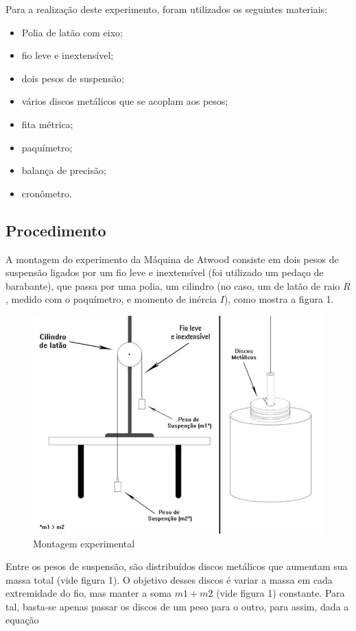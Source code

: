\documentclass[12pt,a4paper]{article}
\begin{document}
Para a realização deste experimento, foram utilizados os seguintes materiais:
\begin{itemize}
	\item Polia de latão com eixo;
	\item fio leve e inextensível;
	\item dois pesos de suspensão;
	\item vários discos metálicos que se acoplam aos pesos;
	\item fita métrica;
	\item paquímetro;
	\item balança de precisão;
	\item cronômetro.
\end{itemize}

\subsection{Procedimento}
A montagem do experimento da Máquina de Atwood consiste em dois pesos de suspensão ligados por um fio leve e inextensível (foi utilizado um pedaço de barabante), que passa por uma polia, um cilindro (no caso, um de latão de raio $R$, medido com o paquímetro, e momento de inércia $I$), como mostra a figura 1. \\

\newpage

\begin{figure}
\centering
\includegraphics[scale=0.55]{FigUnica.jpg}
\caption{Montagem experimental}
\label{Fig1}
\end{figure}

Entre os pesos de suspensão, são distribuídos discos metálicos que aumentam sua massa total (vide figura 1). O objetivo desses discos é variar a massa em cada extremidade do fio, mas manter a soma $m1 + m2$ (vide figura 1) constante. Para tal, basta-se apenas passar os discos de um peso para o outro, para assim, dada a equação
\end{document}
